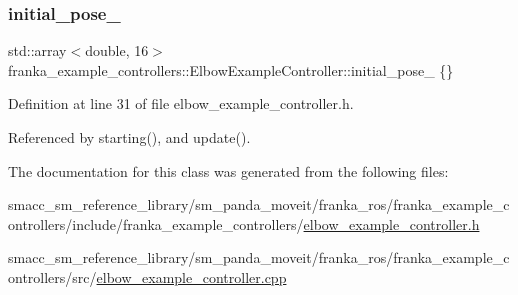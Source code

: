 \subsubsection{\texorpdfstring{initial\+\_\+pose\+\_\+}{initial\_pose\_}}
{\footnotesize\ttfamily std\+::array$<$double, 16$>$ franka\+\_\+example\+\_\+controllers\+::\+Elbow\+Example\+Controller\+::initial\+\_\+pose\+\_\+ \{\}\hspace{0.3cm}{\ttfamily [private]}}



Definition at line 31 of file elbow\+\_\+example\+\_\+controller.\+h.



Referenced by starting(), and update().



The documentation for this class was generated from the following files\+:\begin{DoxyCompactItemize}
\item 
smacc\+\_\+sm\+\_\+reference\+\_\+library/sm\+\_\+panda\+\_\+moveit/franka\+\_\+ros/franka\+\_\+example\+\_\+controllers/include/franka\+\_\+example\+\_\+controllers/\hyperlink{elbow__example__controller_8h}{elbow\+\_\+example\+\_\+controller.\+h}\item 
smacc\+\_\+sm\+\_\+reference\+\_\+library/sm\+\_\+panda\+\_\+moveit/franka\+\_\+ros/franka\+\_\+example\+\_\+controllers/src/\hyperlink{elbow__example__controller_8cpp}{elbow\+\_\+example\+\_\+controller.\+cpp}\end{DoxyCompactItemize}
